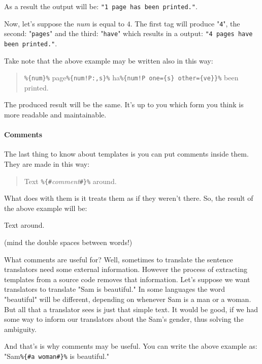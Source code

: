 As a result the output will be: \texttt{"1 page has been printed."}.

Now, let's suppose the \textit{num} is equal to $4$. 
The first tag will produce "\texttt{4}", the second: "\texttt{pages}" and the third: "\texttt{have}" which results in a output:
\texttt{"4 pages have been printed."}.

\vspace{2em}

Take note that the above example may be written also in this way:
\begin{quote}
	\verb+%{num}%+ page\verb+%{num!P:,s}%+ ha\verb+%{num!P one={s} other={ve}}%+ been printed.
\end{quote}
The produced result will be the same. It's up to you which form you think is more readable and maintainable. 

\paragraph{Comments} The last thing to know about \mulan{} templates is you can put comments inside them.
They are made in this way:
\begin{quote}
	Text \verb+%{#+\textit{comment}\verb+#}%+ around.
\end{quote}
What \mulan{} does with them is it treats them as if they weren't there. So, the result of the above example will be:
\begin{verbatim*}
Text  around.
\end{verbatim*}(mind the double spaces between words!)

What comments are useful for? Well, sometimes to translate the sentence translators need some external information. 
However the process of extracting templates from a source code removes that information. Let's suppose we want translators to translate "Sam is beautiful."
In some languages the word "beautiful" will be different, depending on whenever Sam is a man or a woman. But all that a translator sees is just that simple text.
It would be good, if we had some way to inform our translators about the Sam's gender, thus solving the ambiguity. 

And that's is why comments may be useful. You can write the above example as: "Sam\verb+%{#a woman#}%+ is beautiful."
